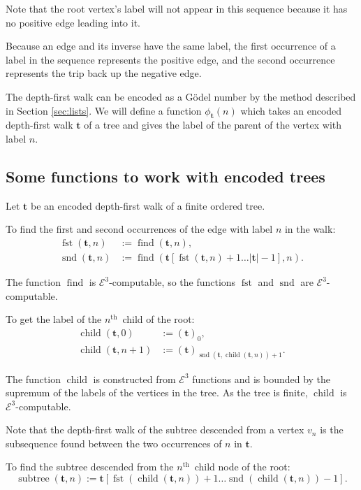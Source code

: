 \documentclass[a4paper]{article}
\newcommand{\grz}[1]{$\mathcal{E}^{#1}$}	%
\newcommand{\nth}{$n^{\textrm{th}}$~}	%
\newcommand{\tvec}{\mathbf{t}}	%
\newcommand{\recur}[1]{\begin{equation} \begin{split} #1 \end{split} \end{equation}}	%
\newcommand{\find}{\operatorname{find}}
\theoremstyle{plain}
\theoremstyle{definition}
\begin{document}
Note that the root vertex's label will not appear in this sequence because it has no positive edge leading into it. 

Because an edge and its inverse have the same label, the first occurrence of a label in the sequence represents the positive edge, and the second occurrence represents the trip back up the negative edge.

The depth-first walk can be encoded as a G\"odel number by the method described in Section \ref{sec:lists}. We will define a function $\phi_{\tvec}(n)$ which takes an encoded depth-first walk $\tvec$ of a tree and gives the label of the parent of the 
vertex with label $n$. 

\subsection{Some functions to work with encoded trees}\label{encodetrees}

Let $\tvec$ be an encoded depth-first walk of a finite ordered tree.

To find the first and second occurrences of the edge with label $n$ in the walk:
\recur{
\operatorname{fst}(\tvec,n) &:= \find(\tvec,n), \\
\operatorname{snd}(\tvec,n) &:= \find\left( \tvec[\operatorname{fst}(\tvec,n)+1 \dots |\tvec|-1],n \right).
}

The function $\operatorname{find}$ is \grz{3}-computable, so the functions $\operatorname{fst}$ and $\operatorname{snd}$ are \grz{3}-computable.

To get the label of the \nth child of the root:
\recur{
\operatorname{child}(\tvec,0) &:= (\tvec)_0, \\
\operatorname{child}(\tvec,n+1) &:= (\tvec)_{\operatorname{snd}(\tvec,\operatorname{child}(\tvec,n))+1}.
}

The function $\operatorname{child}$ is constructed from \grz{3} functions and is bounded by the supremum of the labels of the vertices in the tree. As the tree is finite, $\operatorname{child}$ is \grz{3}-computable.

Note that the depth-first walk of the subtree descended from a vertex $v_n$ is the subsequence found between the two occurrences of $n$ in $\tvec$. 

To find the subtree descended from the \nth child node of the root:
\begin{equation} \operatorname{subtree}(\tvec,n) := \tvec[\operatorname{fst}(\operatorname{child}(\tvec,n))+1 \dots \operatorname{snd}(\operatorname{child}(\tvec,n))-1]. \end{equation}
\end{document}
